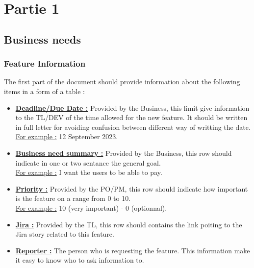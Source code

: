 \documentclass[a4paper,article,oneside]{memoir}
\begin{document}
\tableofcontents
\part{Partie 1}
    \chapter{Business needs}
        \section{Feature Information}
        The first part of the document should provide information about the following items in a form of a table :
        \begin{itemize}
  			\item {\color{BrickRed}\textbf{\underline{Deadline/Due Date :}}} Provided by the \gls{Business}, this limit give information to the \gls{TL}/\gls{DEV} of the time allowed for the new feature. It should be written in full letter for avoiding confusion between different way of writting the date. \\{\color{ForestGreen}\underline{For example :} 12 September 2023.}
  			 \item {\color{BrickRed}\textbf{\underline{Business need summary :}}} Provided by the \gls{Business}, this row should indicate in one or two sentance the general goal. \\{\color{ForestGreen}\underline{For example :} I want the users to be able to pay.}
  			 \item {\color{BrickRed}\textbf{\underline{Priority :}}} Provided by the \gls{PO}/\gls{PM}, this row should indicate how important is the feature on a range from 0 to 10. \\{\color{ForestGreen}\underline{For example :} 10 (very important) - 0 (optionnal).}
  			 \item {\color{BrickRed}\textbf{\underline{Jira :}}} Provided by the \gls{TL}, this row should contains the link poiting to the Jira story related to this feature.
  			   			 \item {\color{BrickRed}\textbf{\underline{Reporter :}}} The person who is requesting the feature. This information make it easy to know who to ask information to.
		\end{itemize}
\noindent{}

		
\end{document}
